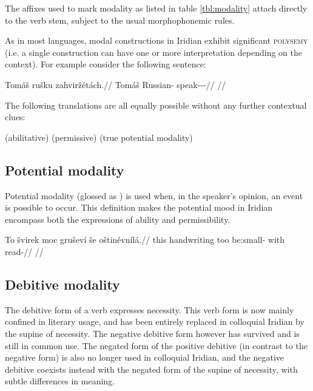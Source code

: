 The affixes used to mark modality as listed in table \ref{tbl:modality} attach
directly to the verb stem, subject to the usual morphophonemic rules.

\pex\a {}
\a {}
\a {}
\a {}
\a {}
\a {}
\a {}
\xe

As in most languages, modal constructions in Iridian exhibit significant
{\scshape polysemy} (i.e. a single construction can have one or
more interpretation depending on the context). For example consider the
following sentence:

\pex
\begingl
\gla Tomáš rušku zahviržétách.//
\glb Tomáš Russian-\Ins{} speak-\Av{}-\Pot{}-\Ctp{}//
\glft {}//
\endgl
\xe

The following translations are all equally possible without any further
contextual clues:

\pex
\a {} (abilitative)
\a {} (permissive)
\a {} (true potential modality)
\xe

\subsection{Potential modality}

Potential modality (glossed as ) is used when, in the speaker's opinion,
an event is possible to occur. This definition makes the potential mood in
Iridian encompass both the expressions of ability and permissibility.

\pex
\begingl
\gla To švirek moc gruševí še oštinévnílá.//
\glb this handwriting too be:small- with read-//
\glft {}//
\endgl
\xe

\subsection{Debitive modality}

The debitive form of a verb expresses necessity. This verb form is now mainly
confined in literary usage, and has been entirely replaced in colloquial Iridian
by the supine of necessity. The negative debitive form however has
survived and is still in common use. The negated form of the
positive debitive (in contrast to the negative form) is also no longer used in
colloquial Iridian, and the negative debitive coexists instead with the negated
form of the supine of necessity, with subtle differences in meaning.

